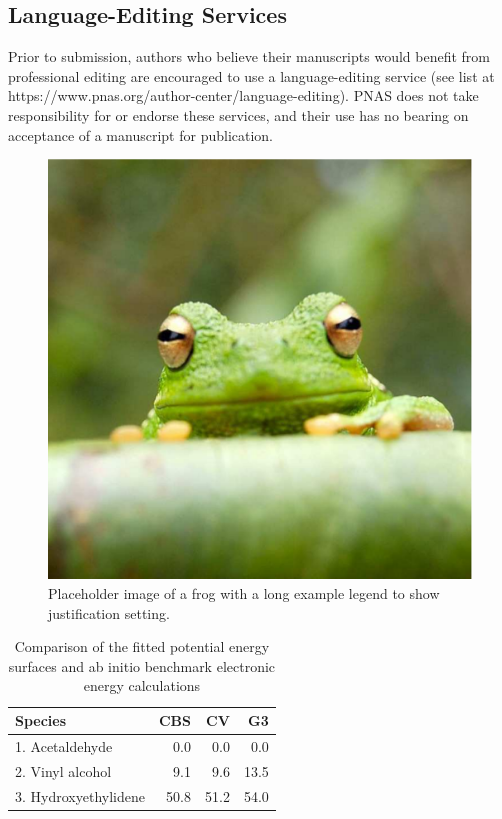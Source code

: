 \documentclass[9pt,twocolumn,twoside]{pnas-new}
\begin{document}
\subsection*{Language-Editing Services}
Prior to submission, authors who believe their manuscripts would benefit from professional editing are encouraged to use a language-editing service (see list at https://www.pnas.org/author-center/language-editing). PNAS does not take responsibility for or endorse these services, and their use has no bearing on acceptance of a manuscript for publication.

\begin{figure}%
\centering
\includegraphics[width=.8\linewidth]{frog.pdf}
\caption{Placeholder image of a frog with a long example legend to show justification setting.}
\label{fig:frog}
\end{figure}



\begin{table}[t!]
\centering
\caption{Comparison of the fitted potential energy surfaces and ab initio benchmark electronic energy calculations}
\begin{tabular}{lrrr}
Species & CBS & CV & G3 \\
\midrule
1. Acetaldehyde & 0.0 & 0.0 & 0.0 \\
2. Vinyl alcohol & 9.1 & 9.6 & 13.5 \\
3. Hydroxyethylidene & 50.8 & 51.2 & 54.0\\
\bottomrule
\end{tabular}

\end{table}
\end{document}
